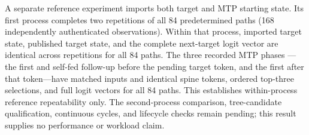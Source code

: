 A separate reference experiment imports both target and MTP starting state.
Its first process completes two repetitions of all 84 predetermined paths
(168 independently authenticated observations). Within that process, imported
target state, published target state, and the complete next-target logit vector
are identical across repetitions for all 84 paths. The three recorded MTP phases
---the first and self-fed follow-up before the pending target token, and the first
after that token---have matched inputs and identical spine tokens, ordered
top-three selections, and full logit vectors for all 84 paths.
This establishes within-process reference repeatability only. The second-process
comparison, tree-candidate qualification, continuous cycles, and lifecycle checks
remain pending; this result supplies no performance or workload claim.
